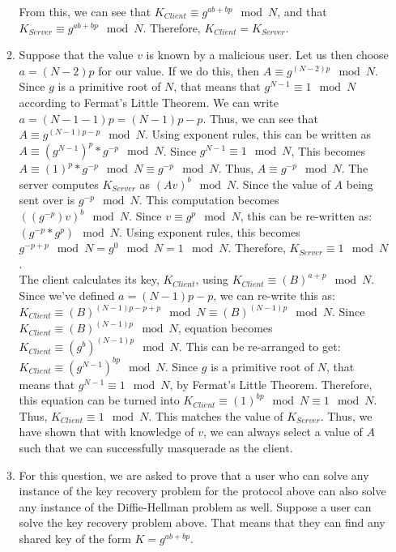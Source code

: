 \documentclass[11pt]{article}
\theoremstyle{definition}
\newcounter{problem}
\begin{document}
\begin{enumerate}
\begin{enumerate}
From this, we can see that $K_{Client} \equiv g^{ab + bp} \mod{N}$, and that $K_{Server} \equiv g^{ab + bp} \mod{N}$. Therefore, $K_{Client} = K_{Server}$.
\\
\item Suppose that the value $v$ is known by a malicious user. Let us then choose $a = (N - 2)p$ for our value. If we do this, then $A \equiv g^{(N - 2)p} \mod{N}$. Since $g$ is a primitive root of $N$, that means that $g^{N - 1} \equiv 1 \mod{N}$ according to Fermat's Little Theorem. We can write $a = (N - 1 - 1)p = (N - 1)p - p$. Thus, we can see that $A \equiv g^{(N-1)p - p} \mod{N}$. Using exponent rules, this can be written as $A \equiv (g^{N-1})^p * g^{-p} \mod{N}$. Since $g^{N-1} \equiv 1 \mod{N}$, This becomes $A \equiv (1)^p * g^{-p} \mod{N} \equiv g^{-p} \mod{N}$. Thus, $A \equiv g^{-p} \mod{N}$. The server computes $K_{Server}$ as $(Av)^b \mod{N}$. Since the value of $A$ being sent over is $g^{-p} \mod {N}$. This computation becomes $((g^{-p})v)^b \mod{N}$. Since $v \equiv g^p \mod{N}$, this can be re-written as: $(g^{-p} * g^p) \mod{N}$. Using exponent rules, this becomes $g^{-p + p} \mod{N} = g^0 \mod{N} = 1 \mod{N}$. Therefore, $K_{Server} \equiv 1 \mod{N}$.\\

The client calculates its key, $K_{Client}$, using $K_{Client} \equiv (B)^{a + p} \mod{N}$. Since we've defined $a = (N - 1)p - p$, we can re-write this as: $K_{Client} \equiv (B)^{(N - 1)p - p + p} \mod{N} \equiv (B)^{(N - 1)p} \mod{N}$. Since $K_{Client} \equiv (B)^{(N - 1)p} \mod{N}$, equation becomes $K_{Client} \equiv (g^b)^{(N - 1)p} \mod{N}$. This can be re-arranged to get: $K_{Client} \equiv (g^{N - 1})^{bp} \mod{N}$. Since $g$ is a primitive root of $N$, that means that $g^{N-1} \equiv 1 \mod{N}$, by Fermat's Little Theorem. Therefore, this equation can be turned into $K_{Client} \equiv (1)^{bp} \mod{N} \equiv 1 \mod{N}$. Thus, $K_{Client} \equiv 1 \mod{N}$. This matches the value of $K_{Server}$. Thus, we have shown that with knowledge of $v$, we can always select a value of $A$ such that we can successfully masquerade as the client.
\\

\item For this question, we are asked to prove that a user who can solve any instance of the key recovery problem for the protocol above can also solve any instance of the Diffie-Hellman problem as well. Suppose a user can solve the key recovery problem above. That means that they can find any shared key of the form $K = g^{ab + bp}$.\\


\end{enumerate}
\end{enumerate}
\end{document}
